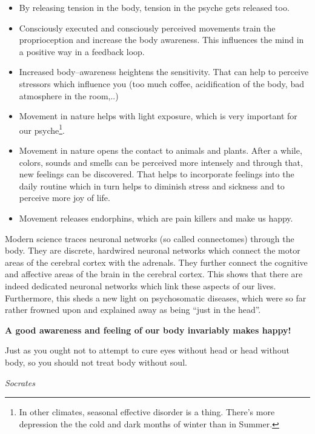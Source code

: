 \documentclass[../Book.Stress_regulation.tex]{subfiles}
\begin{document}
\begin {itemize}
  \item By {releasing tension in the body}, {tension in the psyche} gets released too.
  \item Consciously executed and consciously perceived movements train the {proprioception} and increase the body awareness.
    This influences the mind in a positive way in a feedback loop.
\item Increased body--awareness heightens the sensitivity.
  That can help to {perceive stressors} which influence you (too much coffee, acidification of the body, bad  atmosphere in the room,..)
  \item Movement in nature helps with {light exposure}, which is very important for our psyche\footnote{In other climates, seasonal effective disorder is a thing. There's more depression the the cold and dark months of winter than in Summer.}.  
\item Movement in {nature} opens the contact to animals and plants. After a while, colors, sounds and smells can be {perceived more intensely} and through that, {new feelings} can be discovered.
That helps to {incorporate feelings} into the daily routine which in turn helps to diminish stress and sickness and to {perceive more joy of life}.
\item Movement releases {endorphins}, which are pain killers and make us happy.
\end{itemize}

Modern science traces neuronal networks (so called connectomes) through the body.
They are discrete, hardwired neuronal networks which connect the motor areas of the cerebral cortex with the adrenals.
They further connect the cognitive and affective areas of the brain in the cerebral cortex.
This shows that there are indeed dedicated neuronal networks which link these aspects of our lives.
Furthermore, this sheds a new light on psychosomatic diseases, which were so far rather frowned upon and explained away as being ``just in the head''.~\cite{Connectome}


\noindent \textbf{A good awareness and feeling of our body invariably makes {happy!}}

\epigraph{Just as you ought not to attempt to cure eyes without head or head without body, so you should not treat body without soul.
}{\textit{Socrates}}
\end{document}
